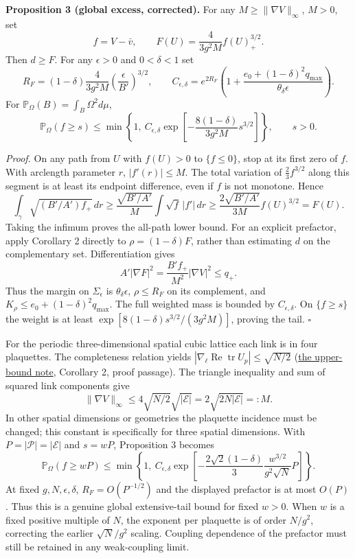 \documentclass[11pt,a4paper]{article}
\begin{document}
\textbf{Proposition 3 (global excess, corrected).} For any
\(M\ge\|\nabla V\|_\infty\), \(M>0\), set
\[f=V-\bar v,\qquad F(U)=\frac{4}{3g^2M}f(U)_+^{3/2}.\] Then \(d\ge F\).
For any \(\epsilon>0\) and \(0<\delta<1\) set
\[R_F=(1-\delta)\frac{4}{3g^2M}
\left(\frac\epsilon{B'}\right)^{3/2},\qquad
C_{\epsilon,\delta}=e^{2R_F}
\left(1+\frac{e_0+(1-\delta)^2q_{\max}}
{\theta_\delta\epsilon}\right).\] For
\(\mathbb P_\Omega(B)=\int_B\Omega^2d\mu\), \[\mathbb P_\Omega(f\ge s)
\le\min\left\{1,\ C_{\epsilon,\delta}
\exp\left[-\frac{8(1-\delta)}{3g^2M}s^{3/2}\right]\right\},
\qquad s>0.\]

\emph{Proof.} On any path from \(U\) with \(f(U)>0\) to \(\{f\le0\}\),
stop at its first zero of \(f\). With arclength parameter \(r\),
\(|f'(r)|\le M\). The total variation of \(\frac23 f^{3/2}\) along this
segment is at least its endpoint difference, even if \(f\) is not
monotone. Hence \[\int_\gamma\sqrt{(B'/A')f_+}\,dr
\ge\frac{\sqrt{B'/A'}}{M}\int\sqrt f\,|f'|\,dr
\ge\frac{2\sqrt{B'/A'}}{3M}f(U)^{3/2}=F(U).\] Taking the infimum proves
the all-path lower bound. For an explicit prefactor, apply Corollary 2
directly to \(\rho=(1-\delta)F\), rather than estimating \(d\) on the
complementary set. Differentiation gives \[A'|\nabla F|^2
=\frac{B'f_+}{M^2}|\nabla V|^2\le q_+.\] Thus the margin on
\(\Sigma_\epsilon\) is \(\theta_\delta\epsilon\), \(\rho\le R_F\) on its
complement, and \(K_\rho\le e_0+(1-\delta)^2q_{\max}\). The full
weighted mass is bounded by \(C_{\epsilon,\delta}\). On \(\{f\ge s\}\)
the weight is at least \(\exp[8(1-\delta)s^{3/2}/(3g^2M)]\), proving the
tail. \(\square\)

For the periodic three-dimensional spatial cubic lattice each link is in
four plaquettes. The completeness relation yields
\(|\nabla_\ell\operatorname{Re}\operatorname{tr}U_p|\le\sqrt{N/2}\)
(\href{lattice-gap-upper-bounds.md}{the upper-bound note}, Corollary 2,
proof passage). The triangle inequality and sum of squared link
components give \[\|\nabla V\|_\infty\le4\sqrt{N/2}\sqrt{|\mathcal E|}
=2\sqrt{2N|\mathcal E|}=:M.\] In other spatial dimensions or geometries
the plaquette incidence must be changed; this constant is specifically
for three spatial dimensions. With \(P=|\mathcal P|=|\mathcal E|\) and
\(s=wP\), Proposition 3 becomes \[\mathbb P_\Omega(f\ge wP)
\le\min\left\{1,\ C_{\epsilon,\delta}
\exp\left[-\frac{2\sqrt2(1-\delta)}{3}
\frac{w^{3/2}}{g^2\sqrt N}P\right]\right\}.\] At fixed
\(g,N,\epsilon,\delta\), \(R_F=O(P^{-1/2})\) and the displayed prefactor
is at most \(O(P)\). Thus this is a genuine global extensive-tail bound
for fixed \(w>0\). When \(w\) is a fixed positive multiple of \(N\), the
exponent per plaquette is of order \(N/g^2\), correcting the earlier
\(\sqrt N/g^2\) scaling. Coupling dependence of the prefactor must still
be retained in any weak-coupling limit.
\end{document}
